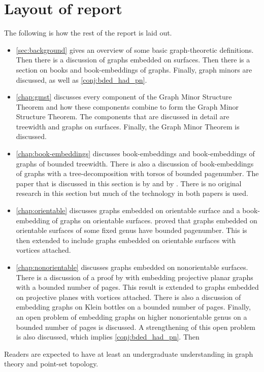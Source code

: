 \section{Layout of report}
The following is how the rest of the report is laid out. 
\begin{itemize}
	\item \cref{sec:background} gives an overview of some basic graph-theoretic definitions. Then there is a discussion of graphs embedded on surfaces. Then there is a section on books and book-embeddings of graphs. Finally, graph minors are discussed, as well as \cref{conj:bded_had_pn}. 
	\item \cref{chap:gmst} discusses every component of the Graph Minor Structure Theorem and how these components combine to form the Graph Minor Structure Theorem. The components that are discussed in detail are treewidth and graphs on surfaces. Finally, the Graph Minor Theorem is discussed.
	\item \cref{chap:book-embeddings} discusses book-embeddings and book-embeddings of graphs of bounded treewidth. There is also a discussion of book-embeddings of graphs with a tree-decomposition with torsos of bounded pagenumber. The paper that is discussed in this section is by \textcite{hickingbothamStackNumberCliqueSum2023} and by \textcite{ganleyPagenumberTrees2001}. There is no original research in this section but much of the technology in both papers is used. 
	\item \cref{chap:orientable} discusses graphs embedded on orientable surface and a book-embedding of graphs on orientable surfaces. \textcite{heathPagenumberGenusGraphs1992} proved that graphs embedded on orientable surfaces of some fixed genus have bounded pagenumber. This is then extended to include graphs embedded on orientable surfaces with vortices attached. 
	\item \cref{chap:nonorientable} discusses graphs embedded on nonorientable surfaces. There is a discussion of a proof by \textcite{nakamotoBookEmbeddingProjectiveplanar2015} with embedding projective planar graphs with a bounded number of pages. This result is extended to graphs embedded on projective planes with vortices attached. There is also a discussion of embedding graphs on Klein bottles on a bounded number of pages. Finally, an open problem of embedding graphs on higher nonorientable genus on a bounded number of pages is discussed. A strengthening of this open problem is also discussed, which implies \cref{conj:bded_had_pn}. Then 
\end{itemize}

Readers are expected to have at least an undergraduate understanding in graph theory and point-set topology. 
